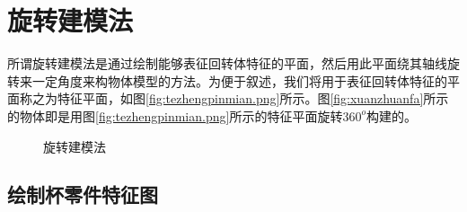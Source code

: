 \section{旋转建模法}
所谓旋转建模法是通过绘制能够表征回转体特征的平面，然后用此平面绕其轴线旋转来一定角度来构物体模型的方法。为便于叙述，我们将用于表征回转体特征的平面称之为特征平面，如图\ref{fig:tezhengpinmian.png}所示。图\ref{fig:xuanzhuanfa}所示的物体即是用图\ref{fig:tezhengpinmian.png}所示的特征平面旋转$360^o$构建的。
\begin{figure}[htbp]
\hspace{20pt}
\caption{旋转建模法}
\end{figure}
\subsection{绘制杯零件特征图}\label{sec:beilingjiantezheng}
